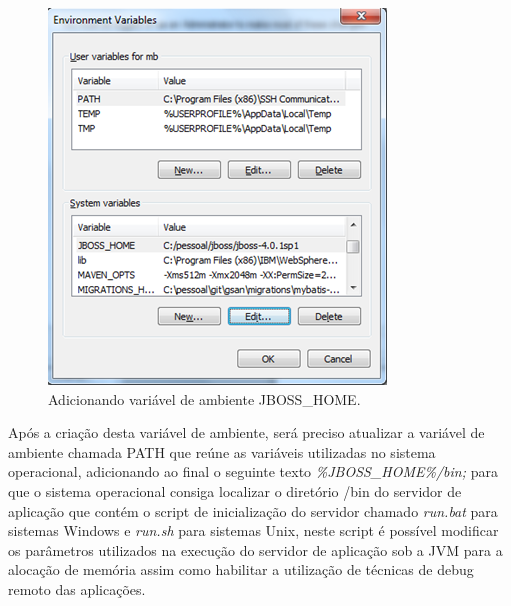 \begin{anexosenv}
\begin{figure}[H]
	\centering
	\caption{Adicionando variável de ambiente JBOSS\_HOME.}
	\label{figura:anexo4}
	\includegraphics{figuras/anexo/var_JBOSS_HOME.png}
\end{figure}

Após a criação desta variável de ambiente, será preciso atualizar a variável de ambiente chamada PATH que reúne as variáveis utilizadas no sistema operacional, adicionando ao final o seguinte texto \textit{\%JBOSS\_HOME\%/bin;} para que o sistema operacional consiga localizar o diretório /bin do servidor de aplicação que contém o script de inicialização do servidor chamado \textit{run.bat} para sistemas Windows e \textit{run.sh} para sistemas Unix, neste script é possível modificar os parâmetros utilizados na execução do servidor de aplicação sob a JVM para a alocação de memória assim como habilitar a utilização de técnicas de debug remoto das aplicações.



\end{anexosenv}
